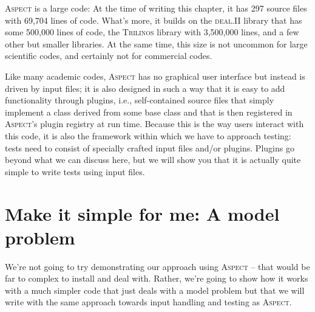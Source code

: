 \documentclass{article}
\newcommand{\dealii}{{\textsc{deal.II}}}
\newcommand{\trilinos}{{\textsc{Trilinos}}}
\newcommand{\aspect}{\textsc{Aspect}}
\begin{document}
\aspect{} is a large code: At the time of writing this chapter, it has 297
source files with 69,704 lines of code. What's more, it builds on the
\dealii{} library that has some 500,000 lines of code, the \trilinos{} library
with 3,500,000 lines, and a few other but smaller libraries. At the same time,
this size is not uncommon for large scientific codes, and certainly not for
commercial codes.

Like many academic codes, \aspect{} has no graphical user interface but
instead is driven by input files; it is also designed in such a way that it is
easy to add functionality through plugins, i.e., self-contained source files
that simply implement a class derived from some base class and that is then
registered in \aspect{}'s plugin registry at run time. Because this is the way
users interact with this code, it is also the framework within which we have
to approach testing: tests need to consist of specially crafted input files
and/or plugins. Plugins go beyond what we can discuss here, but we will show
you that it is actually quite simple to write tests using input files.


\section{Make it simple for me: A model problem}
\label{sec:model-problem}

We're not going to try demonstrating our approach using \aspect{} -- that
would be far to complex to install and deal with. Rather, we're going to show
how it works with a much simpler code that just deals with a model problem but
that we will write with the same approach towards input handling and testing
as \aspect{}.
\end{document}

